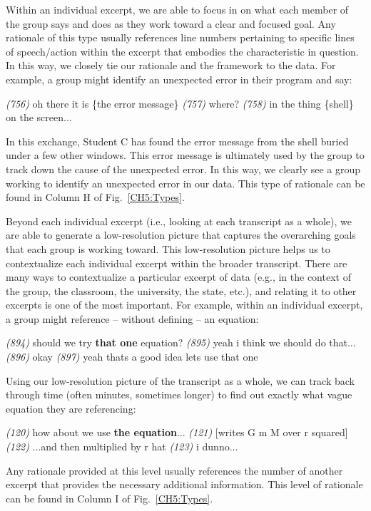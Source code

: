 \documentclass{msuphddissertation}
\begin{document}
\begin{doublespace}
Within an individual excerpt, we are able to focus in on what each member of the group says and does as they work toward a clear and focused goal.  Any rationale of this type usually references line numbers pertaining to specific lines of speech/action within the excerpt that embodies the characteristic in question.  In this way, we closely tie our rationale and the framework to the data.  For example, a group might identify an unexpected error in their program and say: \begin{description}
\SC \textit{(756)} oh there it is \{the error message\}
\SB \textit{(757)} where?
\SC \textit{(758)} in the thing \{shell\} on the screen...
\end{description}  In this exchange, Student C has found the error message from the shell buried under a few other windows.  This error message is ultimately used by the group to track down the cause of the unexpected error.  In this way, we clearly see a group working to identify an unexpected error in our data.  This type of rationale can be found in Column H of Fig.~\ref{CH5:Types}.

Beyond each individual excerpt (i.e., looking at each transcript as a whole), we are able to generate a low-resolution picture that captures the overarching goals that each group is working toward.  This low-resolution picture helps us to contextualize each individual excerpt within the broader transcript.  There are many ways to contextualize a particular excerpt of data (e.g., in the context of the group, the classroom, the university, the state, etc.), and relating it to other excerpts is one of the most important.  For example, within an individual excerpt, a group might reference -- without defining -- an equation: \begin{description}
\SA \textit{(894)} should we try \textbf{that one} equation?
\SB \textit{(895)} yeah i think we should do that...
\SA \textit{(896)} okay
\SC \textit{(897)} yeah thats a good idea lets use that one
\end{description}  Using our low-resolution picture of the transcript as a whole, we can track back through time (often minutes, sometimes longer) to find out exactly what vague equation they are referencing: \begin{description}
\SC \textit{(120)} how about we use \textbf{the equation}...
\SC \textit{(121)} [writes G m M over r squared]
\SC \textit{(122)} ...and then multiplied by r hat
\SD \textit{(123)} i dunno...
\end{description}  Any rationale provided at this level usually references the number of another excerpt that provides the necessary additional information.  This level of rationale can be found in Column I of Fig.~\ref{CH5:Types}.


\end{doublespace}
\end{document}
